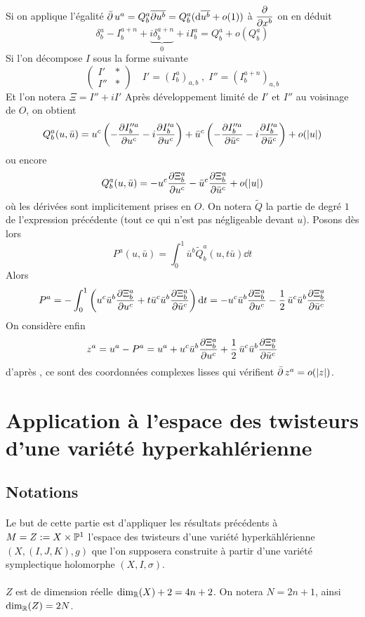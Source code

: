 \documentclass[12pt,draft]{article}
\begin{document}
Si on applique l'égalité $\operatorname{\bar{\partial}} u^a = Q^a_b \overline{\partial u^b} = Q^a_b (\operatorname{d\!} \overline{u^b} + o(1))$ à $\dfrac{\partial{}}{\partial{x^b}}$ on en déduit
\[
\delta^a_b - I^{a+n}_b +\underset{0}{\underbrace{ i\delta^{a+n}_b}} + i I^a_b = Q^a_b + o(Q^a_b)
\]
Si l'on décompose $I$ sous la forme suivante
\[
\begin{pmatrix}
I' & * \\ 
I'' & *
\end{pmatrix} \quad I' = (I^a_b)_{a,b} \; , \; I'' =  (I^{a+n}_b)_{a,b} 
\]
Et l'on notera $\Xi = I'' + iI'$
Après développement limité de $I'$ et $I''$ au voisinage de $O$, on obtient
\[
Q^a_b(u,\bar{u}) = u^c \left(-\dfrac{\partial{I''^a_b}}{\partial{u^c}} - i \dfrac{\partial{I'^a_b}}{\partial{u^c}}\right) + \bar{u}^c\left(-\dfrac{\partial{I''^a_b}}{\partial{\bar{u}^c}} - i \dfrac{\partial{I'^a_b}}{\partial{\bar{u}^c}}\right) + o(|u|)
\]
ou encore
\[
Q^a_b(u,\bar{u}) =  - u^c \dfrac{\partial{\Xi^a_b}}{\partial{u^c}} - \bar{u}^c \dfrac{\partial{\Xi^a_b}}{\partial{\bar{u}^c}}+ o(|u|)
\]
où les dérivées sont implicitement prises en $O$. On notera $\tilde{Q}$ la partie de degré $1$ de l'expression précédente (tout ce qui n'est pas négligeable devant $u$). Posons dès lors
\[
P^a(u, \bar{u}) = \int_0^1 \bar{u}^b \tilde{Q}^a_b(u,t\bar{u})\dd t
\]
Alors
\[
P^a = -\int_0^1 \left(u^c \bar{u}^b \dfrac{\partial{\Xi^a_b}}{\partial{u^c}} +t \bar{u}^c\bar{u}^b \dfrac{\partial{\Xi^a_b}}{\partial{\bar{u}^c}} \right)\operatorname{d\!} t
= - u^c \bar{u}^b \dfrac{\partial{\Xi^a_b}}{\partial{u^c}} - \operatorname{\frac{1}{2}} \bar{u}^c\bar{u}^b \dfrac{\partial{\Xi^a_b}}{\partial{\bar{u}^c}}
\]
On considère enfin
\[
z^a = u^a - P^a = u^a + u^c \bar{u}^b \dfrac{\partial{\Xi^a_b}}{\partial{u^c}} + \operatorname{\frac{1}{2}} \bar{u}^c\bar{u}^b \dfrac{\partial{\Xi^a_b}}{\partial{\bar{u}^c}}
\]
d'après \cite{Demailly}, ce sont des coordonnées complexes lisses qui vérifient $\operatorname{\bar{\partial}} z^a = o(|z|)$.


\section{Application à l'espace des twisteurs d'une variété hyperkahlérienne}
\subsection{Notations}
\cite{Hitchin-Karlhede} \paragraph*{}Le but de cette partie est d'appliquer les résultats précédents à $M=Z :=X \times \mathbb{P}^1$ l'espace des twisteurs d'une variété hyperkählérienne $(X,(I,J,K),g)$ que l'on supposera construite à partir d'une variété symplectique holomorphe $(X,I,\sigma)$. 

\paragraph*{}$Z$ est de dimension réelle $\dim_{\mathbb{R}}(X)+2 = 4n+2$. On notera $N = 2n+1$, ainsi $\dim_{\mathbb{R}}(Z) = 2N$.
\end{document}
